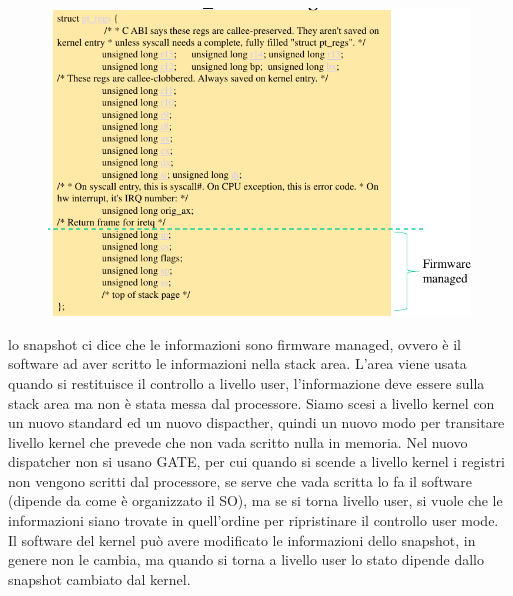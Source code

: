 \documentclass[12pt, oneside]{extbook}
\begin{document}
\begin{figure}[!h]
	\includegraphics[scale=0.3]{immagini/pt_regs_64.png}
\end{figure}
lo snapshot ci dice che le informazioni sono firmware managed, ovvero è il software ad aver scritto le informazioni nella stack area. L'area viene usata quando si restituisce il controllo a livello user, l'informazione deve essere sulla stack area ma non è stata messa dal processore. Siamo scesi a livello kernel con un nuovo standard ed un nuovo dispacther, quindi un nuovo modo per transitare livello kernel che prevede che non vada scritto nulla in memoria. Nel nuovo dispatcher non si usano GATE, per cui quando si scende a livello kernel i registri non vengono scritti dal processore, se serve che vada scritta lo fa il software (dipende da come è organizzato il SO), ma se si torna livello user, si vuole che le informazioni siano trovate in quell'ordine per ripristinare il controllo user mode.\\ Il software del kernel può avere modificato le informazioni dello snapshot, in genere non le cambia, ma quando si torna a livello user lo stato dipende dallo snapshot cambiato dal kernel.
\end{document}
